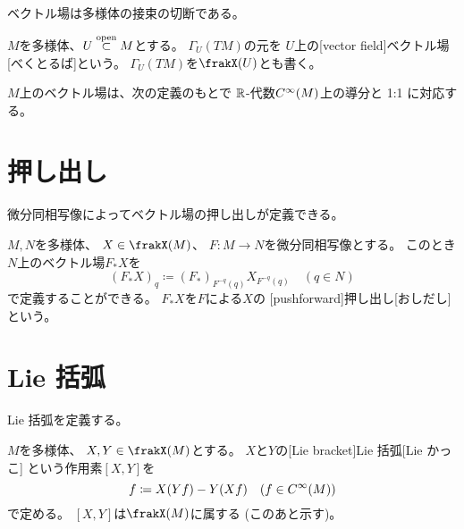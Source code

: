 \documentclass[report]{jlreq}
\begin{document}
ベクトル場は多様体の接束の切断である。

\begin{definition}[ベクトル場]
    $M$を多様体、$U \stackrel{\text{open}}{\subset} M$とする。
    $\Gamma_U(TM)$の元を
    $U$上の[vector field]{ベクトル場}[べくとるば]という。
    $\Gamma_U(TM)$を$\frakX(U)$とも書く。
\end{definition}

$M$上のベクトル場は、次の定義のもとで
$\mathbb{R}$-代数$C^\infty(M)$上の導分と 1:1 に対応する。

\begin{definition}[導分としてのベクトル場]
    \TODO{}
\end{definition}

%
\section{押し出し}

微分同相写像によってベクトル場の押し出しが定義できる。

\begin{definition}[押し出し]
    $M, N$を多様体、
    $X \in \frakX(M)$、
    $F \colon M \to N$を微分同相写像とする。
    このとき$N$上のベクトル場$F_* X$を
    \begin{equation}
        (F_* X)_q \coloneqq (F_*)_{F^{-q}(q)} X_{F^{-q}(q)}
            \quad (q \in N)
    \end{equation}
    で定義することができる。
    $F_* X$を$F$による$X$の
    [pushforward]{押し出し}[おしだし]
    という。
\end{definition}

%
\section{Lie 括弧}

Lie 括弧を定義する。

\begin{definition}[Lie 括弧]
    $M$を多様体、
    $X, Y \in \frakX(M)$とする。
    $X$と$Y$の[Lie bracket]{Lie 括弧}[Lie かっこ]
    という作用素$[X, Y]$を
    \begin{equation}
        [X, Y] f
            \coloneqq X(Yf) - Y(Xf)
            \quad (f \in \smooth(M))
    \end{equation}
    で定める。
    $[X, Y]$は$\frakX(M)$に属する (このあと示す)。
\end{definition}
\end{document}
